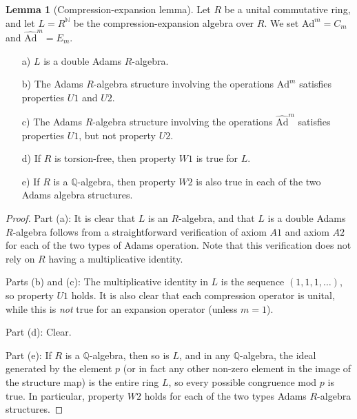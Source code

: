 \documentclass[a4paper]{article}
\theoremstyle{definition}
\newtheorem{lemma}[theorem]{Lemma}
\theoremstyle{remark}
\newcommand{\ad}[1]{\text{Ad}^{#1}}
\newcommand{\hatad}[1]{\widehat{\text{Ad}}^{#1}}
\newcommand{\N}{\mathbb{N}}
\newcommand{\Q}{\mathbb{Q}}
\begin{document}
\begin{lemma}[Compression-expansion lemma] \label{lemma:CE}
Let $R$ be a unital commutative ring, and let $L = R^{\N}$ be the compression-expansion algebra over $R$. We set $\ad{m} = C_m$ and $\hatad{m} = E_m$.
\begin{itemize}
\item[a)] $L$ is a double Adams $R$-algebra. 
\item[b)] The Adams $R$-algebra structure involving the operations $\ad{m}$ satisfies properties $U1$ and $U2$.
\item[c)] The Adams $R$-algebra structure involving the operations $\hatad{m}$ satisfies properties $U1$, but not property $U2$.
\item[d)] If $R$ is torsion-free, then property $W1$ is true for $L$.
\item[e)] If $R$ is a $\Q$-algebra, then property $W2$ is also true in each of the two Adams algebra structures.
\end{itemize}
\end{lemma}


\begin{proof}
Part (a): It is clear that $L$ is an $R$-algebra, and that $L$ is a double Adams $R$-algebra follows from a straightforward verification of axiom $A1$ and axiom $A2$ for each of the two types of Adams operation. Note that this verification does not rely on $R$ having a multiplicative identity. 

Parts (b) and (c): The multiplicative identity in $L$ is the sequence $(1, 1, 1, \ldots)$, so property $U1$ holds. It is also clear that each compression operator is unital, while this is \emph{not} true for an expansion operator (unless $m = 1$).

Part (d): Clear.

Part (e): If $R$ is a $\Q$-algebra, then so is $L$, and in any $\Q$-algebra, the ideal generated by the element $p$ (or in fact any other non-zero element in the image of the structure map) is the entire ring $L$, so every possible congruence mod $p$ is true. In particular, property $W2$ holds for each of the two types Adams $R$-algebra structures.

\end{proof}
\end{document}

